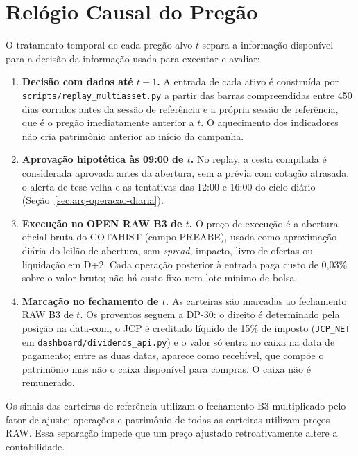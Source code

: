 \FloatBarrier
\section{Relógio Causal do Pregão}
\label{sec:arq-relogio}

O tratamento temporal de cada pregão-alvo $t$ separa a informação disponível para a decisão da informação usada para executar e avaliar:

\begin{enumerate}
  \item \textbf{Decisão com dados até $t-1$.} A entrada de cada ativo é construída por \texttt{scripts/replay\_multiasset.py} a partir das barras compreendidas entre 450 dias corridos antes da sessão de referência e a própria sessão de referência, que é o pregão imediatamente anterior a $t$. O aquecimento dos indicadores não cria patrimônio anterior ao início da campanha.
  \item \textbf{Aprovação hipotética às 09:00 de $t$.} No replay, a cesta compilada é considerada aprovada antes da abertura, sem a prévia com cotação atrasada, o alerta de tese velha e as tentativas das 12:00 e 16:00 do ciclo diário (Seção~\ref{sec:arq-operacao-diaria}).
  \item \textbf{Execução no OPEN RAW B3 de $t$.} O preço de execução é a abertura oficial bruta do COTAHIST (campo PREABE), usada como aproximação diária do leilão de abertura, sem \textit{spread}, impacto, livro de ofertas ou liquidação em D+2. Cada operação posterior à entrada paga custo de 0,03\% sobre o valor bruto; não há custo fixo nem lote mínimo de bolsa.
  \item \textbf{Marcação no fechamento de $t$.} As carteiras são marcadas ao fechamento RAW B3 de $t$. Os proventos seguem a DP-30: o direito é determinado pela posição na data-com, o JCP é creditado líquido de 15\% de imposto (\texttt{JCP\_NET} em \texttt{dashboard/dividends\_api.py}) e o valor só entra no caixa na data de pagamento; entre as duas datas, aparece como recebível, que compõe o patrimônio mas não o caixa disponível para compras. O caixa não é remunerado.
\end{enumerate}

Os sinais das carteiras de referência utilizam o fechamento B3 multiplicado pelo fator de ajuste; operações e patrimônio de todas as carteiras utilizam preços RAW. Essa separação impede que um preço ajustado retroativamente altere a contabilidade.

